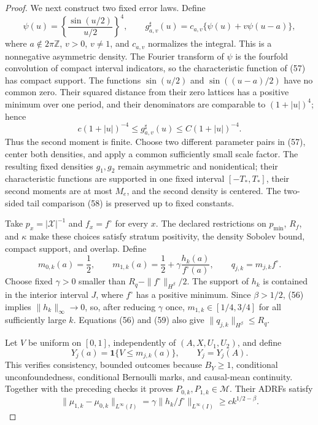 \documentclass{article}
\begin{document}
\begin{proof}
We next construct two fixed error laws.  Define
\[
\psi(u)=\left\{\frac{\sin(u/2)}{u/2}\right\}^4,
\qquad
g_{a,v}^{\sharp}(u)=c_{a,v}\{\psi(u)+v\psi(u-a)\}, \tag{57}
\]
where \(a\notin2\pi\mathbb Z\), \(v>0\), \(v\ne1\), and \(c_{a,v}\) normalizes the integral.  This is a nonnegative asymmetric density.  The Fourier transform of \(\psi\) is the fourfold convolution of compact interval indicators, so the characteristic function of (57) has compact support.  The functions \(\sin(u/2)\) and \(\sin((u-a)/2)\) have no common zero.  Their squared distance from their zero lattices has a positive minimum over one period, and their denominators are comparable to \((1+|u|)^4\); hence
\[
c(1+|u|)^{-4}\le g_{a,v}^{\sharp}(u)
\le C(1+|u|)^{-4}. \tag{58}
\]
Thus the second moment is finite.  Choose two different parameter pairs in (57), center both densities, and apply a common sufficiently small scale factor.  The resulting fixed densities \(g_1,g_2\) remain asymmetric and nonidentical; their characteristic functions are supported in one fixed interval \([-T_*,T_*]\), their second moments are at most \(M_e\), and the second density is centered.  The two-sided tail comparison (58) is preserved up to fixed constants.

Take \(p_x=|\mathcal X|^{-1}\) and \(f_x=f^\circ\) for every \(x\).  The declared restrictions on \(p_{\min}\), \(R_f\), and \(\kappa\) make these choices satisfy stratum positivity, the density Sobolev bound, compact support, and overlap.  Define
\[
m_{0,k}(a)=\frac12,
\qquad
m_{1,k}(a)=\frac12+\gamma\frac{h_k(a)}{f^\circ(a)},
\qquad
q_{j,k}=m_{j,k}f^\circ. \tag{59}
\]
Choose fixed \(\gamma>0\) smaller than \(R_q-\|f^\circ\|_{H^\beta}/2\).  The support of \(h_k\) is contained in the interior interval \(J\), where \(f^\circ\) has a positive minimum.  Since \(\beta>1/2\), (56) implies \(\|h_k\|_\infty\to0\), so, after reducing \(\gamma\) once, \(m_{1,k}\in[1/4,3/4]\) for all sufficiently large \(k\).  Equations (56) and (59) also give \(\|q_{j,k}\|_{H^\beta}\le R_q\).

Let \(V\) be uniform on \([0,1]\), independently of \((A,X,U_1,U_2)\), and define
\[
Y_j(a)=\mathbf 1\{V\le m_{j,k}(a)\},
\qquad Y_j=Y_j(A).
\]
This verifies consistency, bounded outcomes because \(B_Y\ge1\), conditional unconfoundedness, conditional Bernoulli marks, and causal-mean continuity.  Together with the preceding checks it proves \(P_{0,k},P_{1,k}\in\mathcal M\).  Their ADRFs satisfy
\[
\|\mu_{1,k}-\mu_{0,k}\|_{L^\infty(I)}
=\gamma\|h_k/f^\circ\|_{L^\infty(I)}
\ge ck^{1/2-\beta}. \tag{60}
\]


\end{proof}
\end{document}
